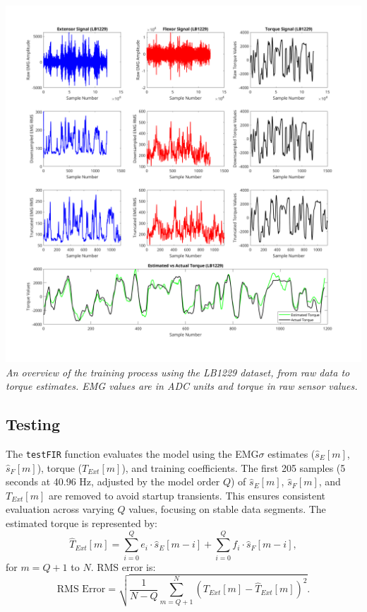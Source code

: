 \documentclass[12pt]{article}
\begin{document}
\begin{center}
     \includegraphics[width=1\textwidth]{plots/lab1_training_overview.png} \\
     \textit{An overview of the training process using the LB1229 dataset, from raw data to torque estimates. EMG values are in ADC units and torque in raw sensor values.}
\end{center}

\newpage
\subsection*{Testing}
The \texttt{testFIR} function evaluates the model using the EMG$\sigma$ estimates ($\hat{s}_E[m]$, $\hat{s}_F[m]$), torque ($T_{Ext}[m]$), and training coefficients. The first 205 samples (5 seconds at 40.96 Hz, adjusted by the model order $Q$) of $\hat{s}_E[m]$, $\hat{s}_F[m]$, and $T_{Ext}[m]$ are removed to avoid startup transients. This ensures consistent evaluation across varying $Q$ values, focusing on stable data segments. The estimated torque is represented by:
\begin{equation}
\hat{T}_{Ext}[m] = \sum_{i=0}^{Q} e_i \cdot \hat{s}_E[m-i] + \sum_{i=0}^{Q} f_i \cdot \hat{s}_F[m-i],
\end{equation}
for $m = Q+1$ to $N$. RMS error is:
\begin{equation}
\text{RMS Error} = \sqrt{\frac{1}{N-Q} \sum_{m=Q+1}^{N} (T_{Ext}[m] - \hat{T}_{Ext}[m])^2}.
\end{equation}
\end{document}
